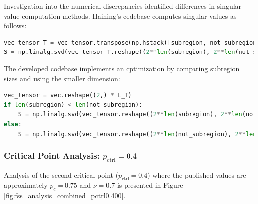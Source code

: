 \documentclass[11pt,a4paper]{article}
\begin{document}
Investigation into the numerical discrepancies identified differences in singular value computation methods. Haining's codebase computes singular values as follows:

\begin{lstlisting}[language=Python]
vec_tensor_T = vec_tensor.transpose(np.hstack([subregion, not_subregion]))
S = np.linalg.svd(vec_tensor_T.reshape((2**len(subregion), 2**len(not_subregion))), compute_uv=False)
\end{lstlisting}

The developed codebase implements an optimization by comparing subregion sizes and using the smaller dimension:

\begin{lstlisting}[language=Python]
vec_tensor = vec.reshape((2,) * L_T)
if len(subregion) < len(not_subregion):
    S = np.linalg.svd(vec_tensor.reshape((2**len(subregion), 2**len(not_subregion))), compute_uv=False)
else:
    S = np.linalg.svd(vec_tensor.reshape((2**len(not_subregion), 2**len(subregion))), compute_uv=False)
\end{lstlisting}

\subsubsection{Critical Point Analysis: $p_\text{ctrl}=0.4$}

Analysis of the second critical point ($p_\text{ctrl}=0.4$) where the published values are approximately $p_c=0.75$ and $\nu=0.7$ is presented in Figure \ref{fig:fss_analysis_combined_pctrl0.400}.
\end{document}
